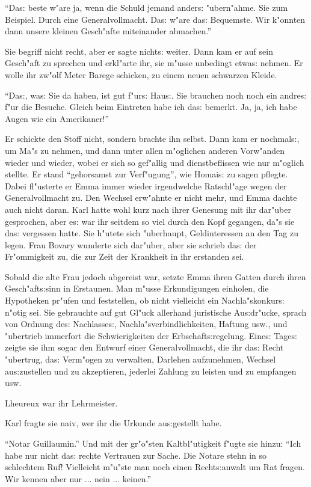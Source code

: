 \documentclass[oneside,12pt]{book}
\newcommand{\s}{s:}%
\begin{document}
"`Da{\s} beste w"are ja, wenn die Schuld jemand ander{\s}
"ubern"ahme. Sie zum Beispiel. Durch eine Generalvollmacht. Da{\s}
w"are da{\s} Bequemste. Wir k"onnten dann unsere kleinen
Gesch"afte miteinander abmachen."'

Sie begriff nicht recht, aber er sagte nicht{\s} weiter. Dann kam
er auf sein Gesch"aft zu sprechen und erkl"arte ihr, sie m"usse
unbedingt etwa{\s} nehmen. Er wolle ihr zw"olf Meter Barege
schicken, zu einem neuen schwarzen Kleide.

"`Da{\s}, wa{\s} Sie da haben, ist gut f"ur{\s} Hau{\s}. Sie
brauchen noch noch ein andre{\s} f"ur die Besuche. Gleich beim
Eintreten habe ich da{\s} bemerkt. Ja, ja, ich habe Augen wie ein
Amerikaner!"'

Er schickte den Stoff nicht, sondern brachte ihn selbst. Dann kam
er nochmal{\s}, um Ma"s zu nehmen, und dann unter allen m"oglichen
anderen Vorw"anden wieder und wieder, wobei er sich so gef"allig
und dienstbeflissen wie nur m"oglich stellte. Er stand
"`gehorsamst zur Verf"ugung"', wie Homai{\s} zu sagen pflegte.
Dabei fl"usterte er Emma immer wieder irgendwelche Ratschl"age
wegen der Generalvollmacht zu. Den Wechsel erw"ahnte er nicht
mehr, und Emma dachte auch nicht daran. Karl hatte wohl kurz nach
ihrer Genesung mit ihr dar"uber gesprochen, aber e{\s} war ihr
seitdem so viel durch den Kopf gegangen, da"s sie da{\s} vergessen
hatte. Sie h"utete sich "uberhaupt, Geldinteressen an den Tag zu
legen. Frau Bovary wunderte sich dar"uber, aber sie schrieb da{\s}
der Fr"ommigkeit zu, die zur Zeit der Krankheit in ihr erstanden
sei.

Sobald die alte Frau jedoch abgereist war, setzte Emma ihren
Gatten durch ihren Gesch"aft{\s}sinn in Erstaunen. Man m"usse
Erkundigungen einholen, die Hypotheken pr"ufen und feststellen, ob
nicht vielleicht ein Nachla"skonkur{\s} n"otig sei. Sie gebrauchte
auf gut Gl"uck allerhand juristische Au{\s}dr"ucke, sprach von
Ordnung de{\s} Nachlasse{\s}, Nachla"sverbindlichkeiten, Haftung
usw., und "ubertrieb immerfort die Schwierigkeiten der
Erbschaft{\s}regelung. Eine{\s} Tage{\s} zeigte sie ihm sogar den
Entwurf einer Generalvollmacht, die ihr da{\s} Recht "ubertrug,
da{\s} Verm"ogen zu verwalten, Darlehen aufzunehmen, Wechsel
au{\s}zustellen und zu akzeptieren, jederlei Zahlung zu leisten
und zu empfangen usw.

Lheureux war ihr Lehrmeister.

Karl fragte sie naiv, wer ihr die Urkunde au{\s}gestellt habe.

"`Notar Guillaumin."' Und mit der gr"o"sten Kaltbl"utigkeit f"ugte
sie hinzu: "`Ich habe nur nicht da{\s} rechte Vertrauen zur Sache.
Die Notare stehn in so schlechtem Ruf! Vielleicht m"u"ste man noch
einen Recht{\s}anwalt um Rat fragen. Wir kennen aber nur ... nein
... keinen."'
\end{document}

